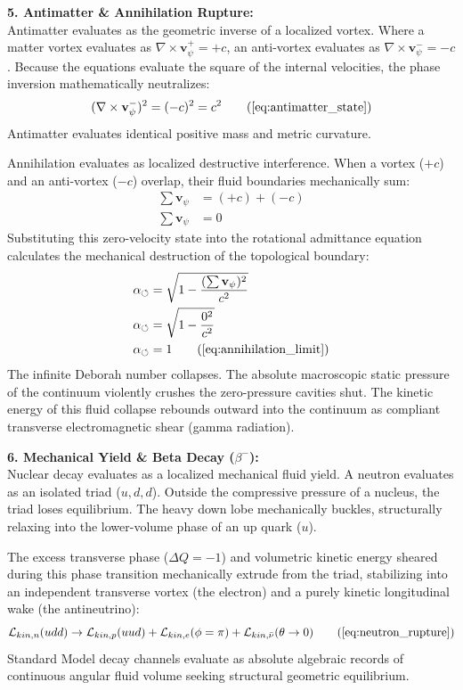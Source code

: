 \documentclass[11pt, a4paper]{article}
\begin{document}
\textbf{5. Antimatter \& Annihilation Rupture:} \\
Antimatter evaluates as the geometric inverse of a localized vortex. Where a matter vortex evaluates as $\nabla \times \mathbf{v}_{\psi}^+ = +c$, an anti-vortex evaluates as $\nabla \times \mathbf{v}_{\psi}^- = -c$. Because the equations evaluate the square of the internal velocities, the phase inversion mathematically neutralizes:
\begin{equation}
    (\nabla \times \mathbf{v}_{\psi}^-)^2 = (-c)^2 = c^2 \tag{\ref{eq:antimatter_state}}
\end{equation}
Antimatter evaluates identical positive mass and metric curvature. 

Annihilation evaluates as localized destructive interference. When a vortex ($+c$) and an anti-vortex ($-c$) overlap, their fluid boundaries mechanically sum:
\begin{align}
    \sum \mathbf{v}_{\psi} &= (+c) + (-c) \nonumber \\
    \sum \mathbf{v}_{\psi} &= 0 \nonumber
\end{align}
Substituting this zero-velocity state into the rotational admittance equation calculates the mechanical destruction of the topological boundary:
\begin{align}
    \alpha_{\circlearrowleft} &= \sqrt{1 - \frac{(\sum \mathbf{v}_{\psi})^2}{c^2}} \nonumber \\
    \alpha_{\circlearrowleft} &= \sqrt{1 - \frac{0^2}{c^2}} \nonumber \\
    \alpha_{\circlearrowleft} &= 1 \tag{\ref{eq:annihilation_limit}}
\end{align}
The infinite Deborah number collapses. The absolute macroscopic static pressure of the continuum violently crushes the zero-pressure cavities shut. The kinetic energy of this fluid collapse rebounds outward into the continuum as compliant transverse electromagnetic shear (gamma radiation).

\textbf{6. Mechanical Yield \& Beta Decay ($\beta^-$):} \\
Nuclear decay evaluates as a localized mechanical fluid yield. A neutron evaluates as an isolated triad ($u, d, d$). Outside the compressive pressure of a nucleus, the triad loses equilibrium. The heavy down lobe mechanically buckles, structurally relaxing into the lower-volume phase of an up quark ($u$). 

The excess transverse phase ($\Delta Q = -1$) and volumetric kinetic energy sheared during this phase transition mechanically extrude from the triad, stabilizing into an independent transverse vortex (the electron) and a purely kinetic longitudinal wake (the antineutrino):
\begin{equation}
    \mathcal{L}_{kin, n}(udd) \to \mathcal{L}_{kin, p}(uud) + \mathcal{L}_{kin, e}(\phi=\pi) + \mathcal{L}_{kin, \bar{\nu}}(\theta \to 0) \tag{\ref{eq:neutron_rupture}}
\end{equation}
Standard Model decay channels evaluate as absolute algebraic records of continuous angular fluid volume seeking structural geometric equilibrium.
\end{document}

